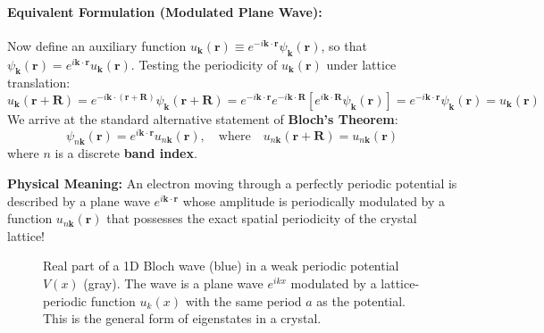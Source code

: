 \documentclass[11pt,a4paper]{article}
\newcommand{\vb}[1]{\mathbf{#1}}
\begin{document}
\paragraph{Equivalent Formulation (Modulated Plane Wave):}
Now define an auxiliary function $u_{\vb{k}}(\vb{r}) \equiv e^{-i\vb{k}\cdot\vb{r}}\psi_{\vb{k}}(\vb{r})$, so that $\psi_{\vb{k}}(\vb{r}) = e^{i\vb{k}\cdot\vb{r}}u_{\vb{k}}(\vb{r})$. Testing the periodicity of $u_{\vb{k}}(\vb{r})$ under lattice translation:
\begin{equation}
u_{\vb{k}}(\vb{r} + \vb{R}) = e^{-i\vb{k}\cdot(\vb{r}+\vb{R})}\psi_{\vb{k}}(\vb{r}+\vb{R}) = e^{-i\vb{k}\cdot\vb{r}}e^{-i\vb{k}\cdot\vb{R}}\left[ e^{i\vb{k}\cdot\vb{R}}\psi_{\vb{k}}(\vb{r}) \right] = e^{-i\vb{k}\cdot\vb{r}}\psi_{\vb{k}}(\vb{r}) = u_{\vb{k}}(\vb{r})
\end{equation}
We arrive at the standard alternative statement of \textbf{Bloch's Theorem}:
\begin{equation}
\boxed{\psi_{n\vb{k}}(\vb{r}) = e^{i\vb{k}\cdot\vb{r}} u_{n\vb{k}}(\vb{r}), \quad \text{where} \quad u_{n\vb{k}}(\vb{r} + \vb{R}) = u_{n\vb{k}}(\vb{r})}
\label{eq:bloch_statement_2}
\end{equation}
where $n$ is a discrete \textbf{band index}. 

\textbf{Physical Meaning:} An electron moving through a perfectly periodic potential is described by a plane wave $e^{i\vb{k}\cdot\vb{r}}$ whose amplitude is periodically modulated by a function $u_{n\vb{k}}(\vb{r})$ that possesses the exact spatial periodicity of the crystal lattice!

\begin{figure}[h]
\centering
{}
\caption{Real part of a 1D Bloch wave (blue) in a weak periodic potential $V(x)$ (gray). The wave is a plane wave $e^{ikx}$ modulated by a lattice-periodic function $u_k(x)$ with the same period $a$ as the potential. This is the general form of eigenstates in a crystal.}
\label{fig:bloch}
\end{figure}
\end{document}
